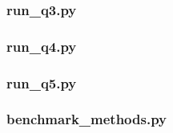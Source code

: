 \documentclass[12pt,a4paper]{article}
\begin{document}
\subsubsection*{run\_q3.py}


\subsubsection*{run\_q4.py}


\subsubsection*{run\_q5.py}


\subsubsection*{benchmark\_methods.py}

\end{document}
